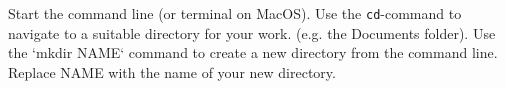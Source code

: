 Start the command line (or terminal on MacOS). Use the \texttt{cd}-command to navigate to a suitable directory for your work. (e.g. the Documents folder). Use the `mkdir NAME` command to create a new directory from the command line. Replace NAME with the name of your new directory.
